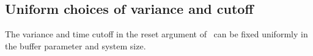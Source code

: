\subsection{Uniform choices of variance and cutoff}
\label{sec:gaussian_parameters}

The variance and time cutoff in the reset argument
of~\cite{OpenAI2026PolynomialPEPS} can be fixed uniformly in the buffer
parameter and system size.

